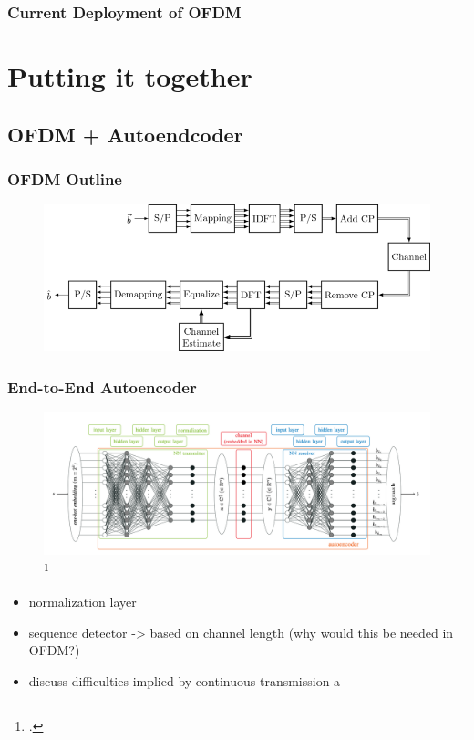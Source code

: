 \documentclass{beamer}
\begin{document}
\begin{frame}
\frametitle{Current Deployment of OFDM}
	
\end{frame}


\section{Putting it together}

\subsection{OFDM + Autoendcoder}




\begin{frame}[label=OFDM]
	\frametitle{OFDM Outline}
	\begin{figure}
		\includegraphics[scale=.4]{Images/Output/ofdm.png}
	\end{figure}
\end{frame}


\begin{frame}[label=OFDM]
	\frametitle{End-to-End Autoencoder}
	\begin{figure}[t]
		\includegraphics[scale=.4]{Images/endtoend.png}
		\centering
		\caption{\footcite{felix2018ofdm}}
	\end{figure}
	\begin{itemize}
		\item normalization layer
		\item sequence detector  -> based on channel length (why would this be needed in OFDM?)
		\item discuss difficulties implied by continuous transmission a
	\end{itemize}
\end{frame}
\end{document}
